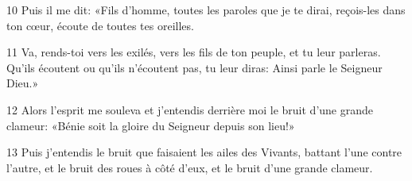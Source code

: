 
10 Puis il me dit: «Fils d’homme, toutes les paroles que je te dirai, reçois-les dans ton cœur, écoute de toutes tes oreilles.

11 Va, rends-toi vers les exilés, vers les fils de ton peuple, et tu leur parleras. Qu’ils écoutent ou qu’ils n’écoutent pas, tu leur diras: Ainsi parle le Seigneur Dieu.»

12 Alors l’esprit me souleva et j’entendis derrière moi le bruit d’une grande clameur: «Bénie soit la gloire du Seigneur depuis son lieu!»

13 Puis j’entendis le bruit que faisaient les ailes des Vivants, battant l’une contre l’autre, et le bruit des roues à côté d’eux, et le bruit d’une grande clameur.